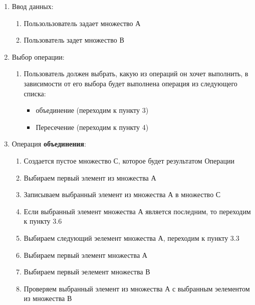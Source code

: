 \documentclass[a4paper,12pt]{extarticle}
\begin{document}
\begin{enumerate}
  \item Ввод данных:
  \begin{enumerate}[label*=\arabic*.]
    \item Пользользователь задает множество А
    \item Пользователь задет множество В
  \end{enumerate}
  \item Выбор операции:
  \begin{enumerate}[label*=\arabic*.]
    \item Пользователь должен выбрать, какую из операций он хочет выполнить, в зависимости от его выбора будет выполнена операция из следующего списка:
    \begin{itemize}
      \item объединение (переходим к пункту 3)
      \item Пересечение (переходим к пункту 4)
    \end{itemize}
  \end{enumerate}
  \item Операция \textbf{объединения}:
  \begin{enumerate}[label*=\arabic*.]
    \item Создается пустое множество С, которое будет результатом Операции
    \item Выбираем первый элемент из множества А
    \item Записываем выбранный элемент из множества А в множество С
    \item Если выбранный элемент множества А является последним, то переходим к пункту 3.6
    \item Выбираем следующий эелемент множества А, переходим к пункту 3.3
    \item Выбираем первый элемент множества А
    \item Выбираем первый эелемент множества В
    \item Проверяем выбранный элемент из множества А с выбранным эелементом из множества В
  \end{enumerate}
\end{enumerate}
\end{document}

